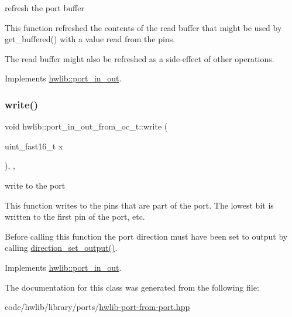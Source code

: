 refresh the port buffer

This function refreshed the contents of the read buffer that might be used by get\+\_\+buffered() with a value read from the pins.

The read buffer might also be refreshed as a side-\/effect of other operations. 

Implements \hyperlink{classhwlib_1_1port__in__out_afa3680e36a05dd3f5a0eac1b63aac37c}{hwlib\+::port\+\_\+in\+\_\+out}.

\mbox{\label{classhwlib_1_1port__in__out__from__oc__t_a47f3cada1694544f728d33f85918a806}} 
\subsubsection{\texorpdfstring{write()}{write()}}
{\footnotesize\ttfamily void hwlib\+::port\+\_\+in\+\_\+out\+\_\+from\+\_\+oc\+\_\+t\+::write (\begin{DoxyParamCaption}\item[{uint\+\_\+fast16\+\_\+t}]{x }\end{DoxyParamCaption})\hspace{0.3cm}{\ttfamily [inline]}, {\ttfamily [override]}, {\ttfamily [virtual]}}

write to the port

This function writes to the pins that are part of the port. The lowest bit is written to the first pin of the port, etc.

Before calling this function the port direction must have been set to output by calling \hyperlink{classhwlib_1_1port__in__out__from__oc__t_ab4cd56460a6627c3fc7f39cb2e78a9c8}{direction\+\_\+set\+\_\+output()}. 

Implements \hyperlink{classhwlib_1_1port__in__out_a0019c1f35d6f7b1d3ace6b22da86ecec}{hwlib\+::port\+\_\+in\+\_\+out}.



The documentation for this class was generated from the following file\+:\begin{DoxyCompactItemize}
\item 
code/hwlib/library/ports/\hyperlink{hwlib-port-from-port_8hpp}{hwlib-\/port-\/from-\/port.\+hpp}\end{DoxyCompactItemize}
